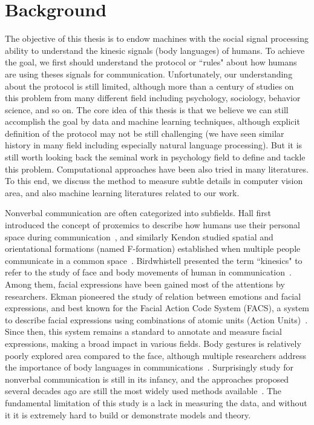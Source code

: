 
\chapter{Background}

The objective of this thesis is to endow machines with the social signal processing ability to understand the kinesic signals (body languages)  of humans. To achieve the goal, we first should understand the protocol or ``rules" about how humans are using theses signals for communication. Unfortunately, our understanding about the protocol is still limited, although more than a century of studies on this problem from many different field including psychology, sociology, behavior science, and so on. The core idea of this thesis is that we believe we can still accomplish the goal by data and machine learning techniques, although explicit definition of the protocol may not be still challenging (we have seen similar history in many field including especially natural language processing). But it is still worth looking back the seminal work in psychology field to define and tackle this problem. Computational approaches have been also tried in many literatures. To this end, we discuss the method to measure subtle details in computer vision area, and also machine learning literatures related to our work. 


Nonverbal communication are often categorized into subfields. Hall first introduced the concept of proxemics to describe how humans use their personal space during communication~\cite{Hall66}, and similarly Kendon studied spatial and orientational formations (named F-formation) established when multiple people communicate in a common space~\cite{kendon90}. Birdwhistell presented the term ``kinesics" to refer to the study of face and body movements of human in communication~\cite{Birdwhistell52, ekman1969}. Among them, facial expressions have been gained most of the attentions by researchers. Ekman pioneered the study of relation between emotions and facial expressions, and best known for the Facial Action Code System (FACS), a system to describe facial expressions using combinations of atomic units (Action Units)~\cite{ekman1977facial}. Since then, this system remains a standard to annotate and measure facial expressions, making a broad impact in various fields. Body gestures is relatively poorly explored area compared to the face, although multiple researchers address the importance of body languages in communications~\cite{Gelder09, Moore13, Meeren-2005, Aviezer-2012}. Surprisingly study for nonverbal communication is still in its infancy, and the approaches proposed several decades ago are still the most widely used methods available~\cite{Moore13}. 
The fundamental limitation of this study is a lack in measuring the data, and without it it is extremely hard to build or demonstrate models and theory.  
\\

